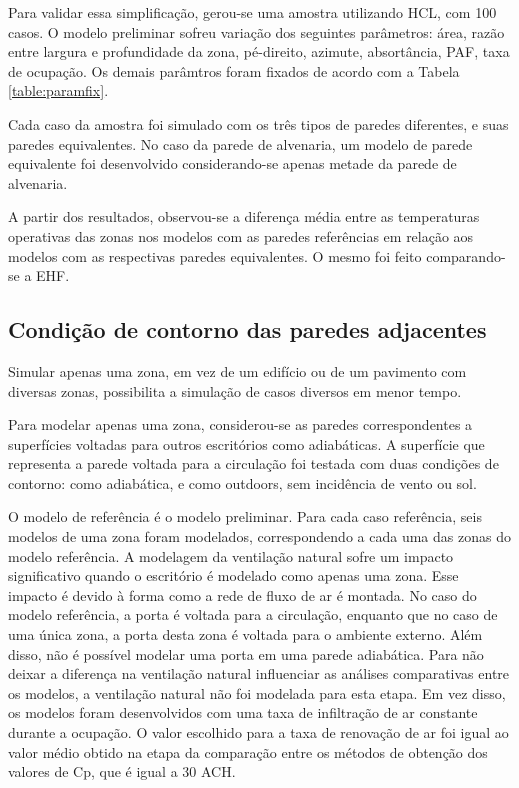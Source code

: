 \documentclass[brazil,hardcopy,openany,a5paper]{ufscthesis}
\begin{document}
		Para validar essa simplificação, gerou-se uma amostra utilizando HCL, com 100 casos. O modelo preliminar sofreu variação dos seguintes parâmetros: área, razão entre largura e profundidade da zona, pé-direito, azimute, absortância, PAF, taxa de ocupação. Os demais parâmtros foram fixados de acordo com a Tabela \ref{table:paramfix}.
		
		Cada caso da amostra foi simulado com os três tipos de paredes diferentes, e suas paredes equivalentes. No caso da parede de alvenaria, um modelo de parede equivalente foi desenvolvido considerando-se apenas metade da parede de alvenaria.
		
		A partir dos resultados, observou-se a diferença média entre as temperaturas operativas das zonas nos modelos com as paredes referências em relação aos modelos com as respectivas paredes equivalentes. O mesmo foi feito comparando-se a EHF.
		
		\subsection{Condição de contorno das paredes adjacentes}
		
		Simular apenas uma zona, em vez de um edifício ou de um pavimento com diversas zonas, possibilita a simulação de casos diversos em menor tempo.
		
		Para modelar apenas uma zona, considerou-se as paredes correspondentes a superfícies voltadas para outros escritórios como adiabáticas. A superfície que representa a parede voltada para a circulação foi testada com duas condições de contorno: como adiabática, e como outdoors, sem incidência de vento ou sol.
		
		O modelo de referência é o modelo preliminar. Para cada caso referência, seis modelos de uma zona foram modelados, correspondendo a cada uma das zonas do modelo referência. A modelagem da ventilação natural sofre um impacto significativo quando o escritório é modelado como apenas uma zona. Esse impacto é devido à forma como a rede de fluxo de ar é montada. No caso do modelo referência, a porta é voltada para a circulação, enquanto que no caso de uma única zona, a porta desta zona é voltada para o ambiente externo. Além disso, não é possível modelar uma porta em uma parede adiabática. Para não deixar a diferença na ventilação natural influenciar as análises comparativas entre os modelos, a ventilação natural não foi modelada para esta etapa. Em vez disso, os modelos foram desenvolvidos com uma taxa de infiltração de ar constante durante a ocupação. O valor escolhido para a taxa de renovação de ar foi igual ao valor médio obtido na etapa da comparação entre os métodos de obtenção dos valores de Cp, que é igual a 30 ACH.
		
\end{document}
